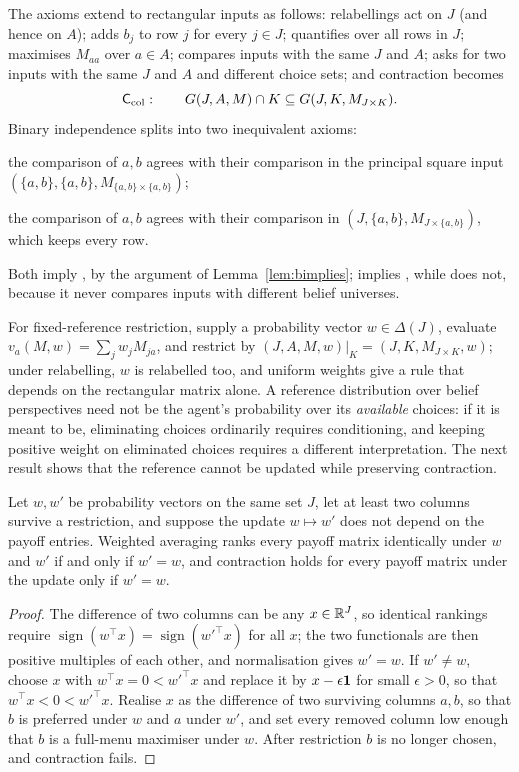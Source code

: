 The axioms extend to rectangular inputs as follows: relabellings act on $J$ (and hence on $A$);
 adds $b_j$ to row $j$ for every $j\in J$;  quantifies over all rows in $J$; 
maximises $M_{aa}$ over $a\in A$;  compares inputs with the same $J$ and $A$;  asks for two
inputs with the same $J$ and $A$ and different choice sets; and contraction becomes
\[
  \textup{\textsf{C}}_{\mathrm{col}}:\qquad G(J,A,M)\cap K\subseteq G(J,K,M_{J\times K}).
\]
Binary independence splits into two inequivalent axioms:
\begin{description}[font=\normalfont,leftmargin=2.4em,labelwidth=1.6em,labelsep=.8em,itemsep=.35em]
  \item[\Bpr] the comparison of $a,b$ agrees with their comparison in the principal square input
        $(\{a,b\},\{a,b\},M_{\{a,b\}\times\{a,b\}})$;
  \item[\Bcol] the comparison of $a,b$ agrees with their comparison in $(J,\{a,b\},M_{J\times\{a,b\}})$,
        which keeps every row.
\end{description}
Both imply \Ccol, by the argument of Lemma~\ref{lem:bimplies}; \Bpr{} implies , while \Bcol{} does
not, because it never compares inputs with different belief universes.

For fixed-reference restriction, supply a probability vector $w\in\Delta(J)$, evaluate
$v_a(M,w)=\sum_jw_jM_{ja}$, and restrict by $(J,A,M,w)|_K=(J,K,M_{J\times K},w)$; under relabelling, $w$
is relabelled too, and uniform weights give a rule that depends on the rectangular matrix alone. A
reference distribution over belief perspectives need not be the agent's probability over its
\emph{available} choices: if it is meant to be, eliminating choices ordinarily requires conditioning,
and keeping positive weight on eliminated choices requires a different interpretation. The next
result shows that the reference cannot be updated while preserving contraction.

\begin{theorem}\label{thm:weights}
Let $w,w'$ be probability vectors on the same set $J$, let at least two columns survive a restriction,
and suppose the update $w\mapsto w'$ does not depend on the payoff entries. Weighted averaging ranks
every payoff matrix identically under $w$ and $w'$ if and only if $w'=w$, and contraction holds for
every payoff matrix under the update only if $w'=w$.
\end{theorem}

\begin{proof}
The difference of two columns can be any $x\in\mathbb{R}^J$, so identical rankings require
$\operatorname{sign}(w^\top x)=\operatorname{sign}(w'^\top x)$ for all $x$; the two functionals are then
positive multiples of each other, and normalisation gives $w'=w$. If $w'\ne w$, choose $x$ with
$w^\top x=0<w'^\top x$ and replace it by $x-\epsilon\mathbf{1}$ for small $\epsilon>0$, so that $w^\top x<0<w'^\top x$.
Realise $x$ as the difference of two surviving columns $a,b$, so that $b$ is preferred under $w$ and
$a$ under $w'$, and set every removed column low enough that $b$ is a full-menu maximiser under $w$.
After restriction $b$ is no longer chosen, and contraction fails.
\end{proof}

